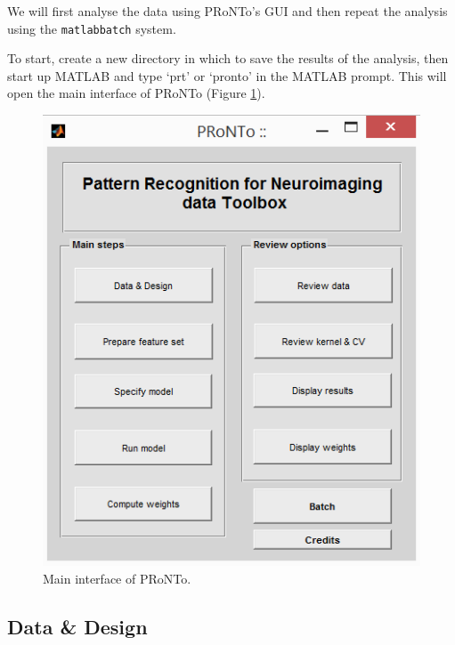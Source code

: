 We will first analyse the data using PRoNTo's GUI and then repeat the analysis using the {\tt matlabbatch} system.

To start, create a new directory in which to save the results of the analysis, then start up MATLAB and type `prt' or `pronto' in the MATLAB prompt. This will open the main interface of PRoNTo (Figure \ref{fig:mainInterfacemkl}).

\begin{figure}[!h]
	\centering
		\includegraphics[scale=0.75]{images/Tutorial/mkl/mainInterfacemkl.png}
	\caption{Main interface of PRoNTo.}
	\label{fig:mainInterfacemkl}
\end{figure}


\subsection{Data \& Design}



